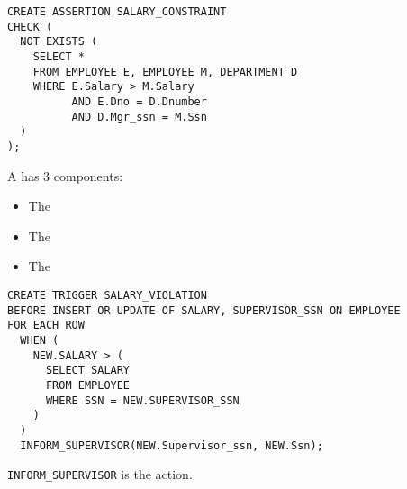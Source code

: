     \begin{verbatim}
CREATE ASSERTION SALARY_CONSTRAINT
CHECK (
  NOT EXISTS (
    SELECT * 
    FROM EMPLOYEE E, EMPLOYEE M, DEPARTMENT D
    WHERE E.Salary > M.Salary
          AND E.Dno = D.Dnumber 
          AND D.Mgr_ssn = M.Ssn
  )
);
    \end{verbatim}

  \par A  has 3 components:
  \begin{itemize}
    \item The 
    \item The 
    \item The 
  \end{itemize}
    \begin{verbatim}  
CREATE TRIGGER SALARY_VIOLATION
BEFORE INSERT OR UPDATE OF SALARY, SUPERVISOR_SSN ON EMPLOYEE
FOR EACH ROW
  WHEN (
    NEW.SALARY > (
      SELECT SALARY
      FROM EMPLOYEE
      WHERE SSN = NEW.SUPERVISOR_SSN
    )
  )
  INFORM_SUPERVISOR(NEW.Supervisor_ssn, NEW.Ssn);
    \end{verbatim}
  \par \lstinline{INFORM_SUPERVISOR} is the action.